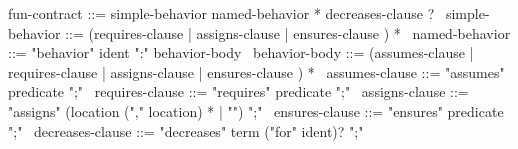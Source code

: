 \begin{syntax}
  fun-contract ::= simple-behavior named-behavior * decreases-clause ? 
  \
  simple-behavior ::= (requires-clause | assigns-clause |
  ensures-clause ) * 
  \
  named-behavior ::= "behavior" ident ":" behavior-body 
  \
  behavior-body ::= (assumes-clause | requires-clause | assigns-clause |
              ensures-clause ) * 
              \
  assumes-clause ::= "assumes" predicate ";"
  \
  requires-clause ::= "requires" predicate ";"
  \
  assigns-clause ::= "assigns" (location ("," location) * |
  "\nothing") ";"
  \
  ensures-clause ::= "ensures" predicate ";"
  \
  decreases-clause ::= "decreases" term ("for" ident)? ";"
\end{syntax}
